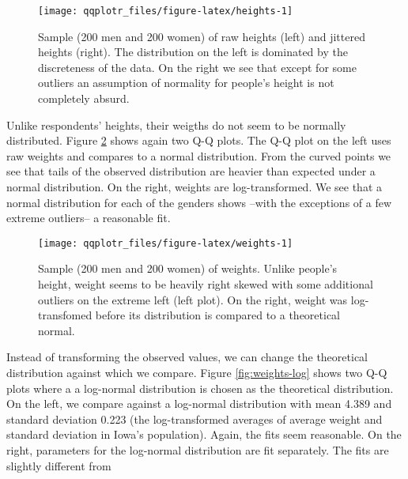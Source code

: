 \begin{Schunk}
\begin{figure}

{\centering \texttt{[image: qqplotr\_files/figure-latex/heights-1]} 

}

\caption[Sample (200 men and 200 women) of raw heights (left) and jittered heights (right)]{Sample (200 men and 200 women) of raw heights (left) and jittered heights (right). The distribution on the left is dominated by the discreteness of the data. On the right we see that except for some outliers an assumption of normality for people's height is not completely absurd.}\label{fig:heights}
\end{figure}
\end{Schunk}

Unlike respondents' heights, their weigths do not seem to be normally
distributed. Figure \ref{fig:weights} shows again two Q-Q plots. The Q-Q
plot on the left uses raw weights and compares to a normal distribution.
From the curved points we see that tails of the observed distribution
are heavier than expected under a normal distribution. On the right,
weights are log-transformed. We see that a normal distribution for each
of the genders shows --with the exceptions of a few extreme outliers-- a
reasonable fit.

\begin{Schunk}
\begin{figure}

{\centering \texttt{[image: qqplotr\_files/figure-latex/weights-1]} 

}

\caption[Sample (200 men and 200 women) of weights]{Sample (200 men and 200 women) of weights. Unlike people's height, weight seems to be heavily right skewed with some additional outliers on the extreme left (left plot). On the right, weight was log-transfomed before its distribution is compared to a theoretical normal. }\label{fig:weights}
\end{figure}
\end{Schunk}

Instead of transforming the observed values, we can change the
theoretical distribution against which we compare. Figure
\ref{fig:weights-log} shows two Q-Q plots where a a log-normal
distribution is chosen as the theoretical distribution. On the left, we
compare against a log-normal distribution with mean 4.389 and standard
deviation 0.223 (the log-transformed averages of average weight and
standard deviation in Iowa's population). Again, the fits seem
reasonable. On the right, parameters for the log-normal distribution are
fit separately. The fits are slightly different from

